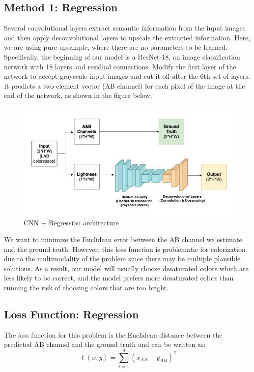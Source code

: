 \documentclass{article}
\begin{document}
\subsection{Method 1: Regression}
Several convolutional layers extract semantic information from the input images and then apply deconvolutional layers to upscale the extracted information.
Here, we are using pure upsample, where there are no parameters to be learned.
Specifically, the beginning of our model is a ResNet-18, an image classification network with 18 layers and residual connections. 
Modify the first layer of the network to accept grayscale input images and cut it off after the 6th set of layers. 
It predicts a two-element vector (AB channel) for each pixel of the image at the end of the network, as shown in the figure below.
\\

\begin{figure}
    \includegraphics[width=\linewidth]{reg.jpg}
    \caption{CNN + Regression architecture}
\end{figure}

We want to minimize the Euclidean error between the AB channel we estimate and the ground truth.
However, this loss function is problematic for colorization due to the multimodality of the problem since there may be multiple plausible solutions.
As a result, our model will usually choose desaturated colors which are less likely to be correct, and the model prefers more desaturated colors than running the risk of choosing colors that are too bright.


\subsection{Loss Function: Regression}
The loss function for this problem is the Euclidean distance between the predicted AB channel and the ground truth and can be written as:
{\Large
\begin{equation}
    \ell(x,y) = \sum_{i=1}^{n} \left( x_{AB} - y_{AB} \right)^2
\end{equation}}
\end{document}
